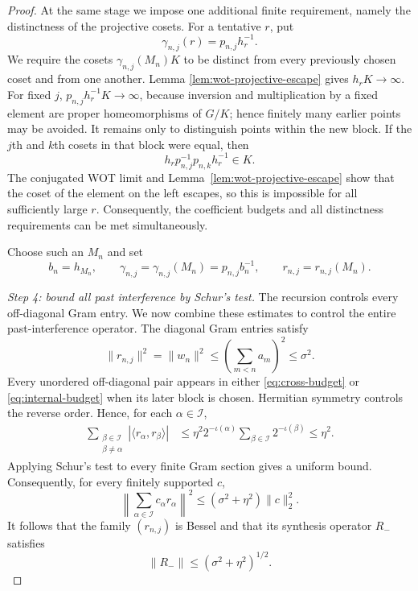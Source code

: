 \documentclass[reqno]{amsart}
\numberwithin{equation}{section}
\theoremstyle{definition}
\theoremstyle{remark}
\newcommand{\cI}{\mathcal I}
\newcommand{\Step}[1]{\par\medskip\noindent\textit{#1.}\quad}
\begin{document}
\begin{proof}
At the same stage we impose one additional finite requirement, namely the
distinctness of the projective cosets.  For a tentative $r$, put
\begin{equation}\label{eq:sampling-elements-tentative}
 \gamma_{n,j}(r)=p_{n,j}h_r^{-1}.
\end{equation}
We require the cosets $\gamma_{n,j}(M_n)K$ to be distinct from every
previously chosen coset and from one another.  Lemma
\ref{lem:wot-projective-escape} gives $h_rK\to\infty$.  For fixed $j$,
$p_{n,j}h_r^{-1}K\to\infty$, because inversion and multiplication by a fixed
element are proper homeomorphisms of $G/K$; hence finitely many earlier points
may be avoided.  It remains only to distinguish points within the new block.
If the $j$th and $k$th cosets in that block were equal, then
\[
 h_rp_{n,j}^{-1}p_{n,k}h_r^{-1}\in K.
\]
The conjugated WOT limit and Lemma~\ref{lem:wot-projective-escape} show that the coset
of the element on the left escapes, so this is impossible for all sufficiently
large $r$.  Consequently, the coefficient budgets and all distinctness
requirements can be met simultaneously.

Choose such an $M_n$ and set
\begin{equation}\label{eq:sampling-elements}
 b_n=h_{M_n},\qquad
 \gamma_{n,j}=\gamma_{n,j}(M_n)=p_{n,j}b_n^{-1},\qquad
 r_{n,j}=r_{n,j}(M_n).
\end{equation}

\Step{Step 4: bound all past interference by Schur's test}
The recursion controls every off-diagonal Gram entry.  We now combine these
estimates to control the entire past-interference operator.  The diagonal
Gram entries satisfy
\begin{equation}\label{eq:past-column-norm}
 \|r_{n,j}\|^2=\|w_n\|^2
 \leq\left(\sum_{m<n}a_m\right)^2
 \leq\sigma^2.
\end{equation}
Every unordered off-diagonal pair appears in either
\eqref{eq:cross-budget} or \eqref{eq:internal-budget} when its later block is
chosen.  Hermitian symmetry controls the reverse order.  Hence, for each
$\alpha\in\cI$,
\begin{align}\label{eq:past-row-sum}
 \sum_{\substack{\beta\in\cI\\\beta\neq\alpha}}
 |\langle r_\alpha,r_\beta\rangle|
 &\leq \eta^2 2^{-\iota(\alpha)}
       \sum_{\beta\in\cI}2^{-\iota(\beta)}
 \leq\eta^2.
\end{align}
Applying Schur's test to every finite Gram section gives a uniform bound.
Consequently, for every finitely supported $c$,
\[
 \left\|\sum_{\alpha\in\cI}c_\alpha r_\alpha\right\|^2
 \leq(\sigma^2+\eta^2)\|c\|_2^2.
\]
It follows that the family $(r_{n,j})$ is Bessel and that its synthesis
operator $R_-$ satisfies
\begin{equation}\label{eq:past-synthesis-bound}
 \|R_-\|\leq(\sigma^2+\eta^2)^{1/2}.
\end{equation}


\end{proof}
\end{document}
